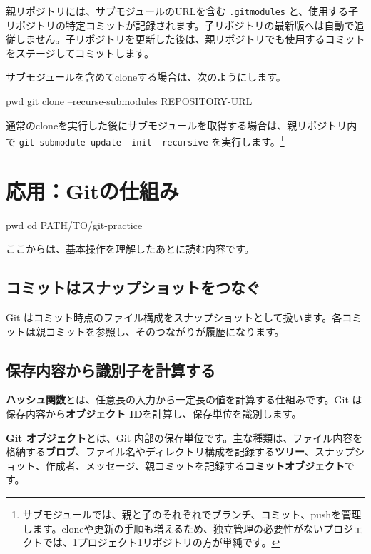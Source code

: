 \documentclass[a4paper,11pt]{jlreq}
\newcommand{\cmd}[1]{\texttt{#1}}
\newcommand{\term}[1]{\textbf{#1}}
\begin{document}
親リポジトリには、サブモジュールのURLを含む \cmd{.gitmodules} と、使用する子リポジトリの特定コミットが記録されます。子リポジトリの最新版へは自動で追従しません。子リポジトリを更新した後は、親リポジトリでも使用するコミットをステージしてコミットします。

サブモジュールを含めてcloneする場合は、次のようにします。

\begin{codeblock}
pwd
git clone --recurse-submodules REPOSITORY-URL
\end{codeblock}

通常のcloneを実行した後にサブモジュールを取得する場合は、親リポジトリ内で \cmd{git submodule update --init --recursive} を実行します。\footnote{サブモジュールでは、親と子のそれぞれでブランチ、コミット、pushを管理します。cloneや更新の手順も増えるため、独立管理の必要性がないプロジェクトでは、1プロジェクト1リポジトリの方が単純です。}

\section{応用：Gitの仕組み}

\begin{codeblock}
pwd
cd PATH/TO/git-practice
\end{codeblock}

ここからは、基本操作を理解したあとに読む内容です。

\subsection{コミットはスナップショットをつなぐ}

Git はコミット時点のファイル構成をスナップショットとして扱います。各コミットは親コミットを参照し、そのつながりが履歴になります。

\subsection{保存内容から識別子を計算する}

\term{ハッシュ関数}とは、任意長の入力から一定長の値を計算する仕組みです。Git は保存内容から\term{オブジェクト ID}を計算し、保存単位を識別します。

\term{Git オブジェクト}とは、Git 内部の保存単位です。主な種類は、ファイル内容を格納する\term{ブロブ}、ファイル名やディレクトリ構成を記録する\term{ツリー}、スナップショット、作成者、メッセージ、親コミットを記録する\term{コミットオブジェクト}です。
\end{document}
